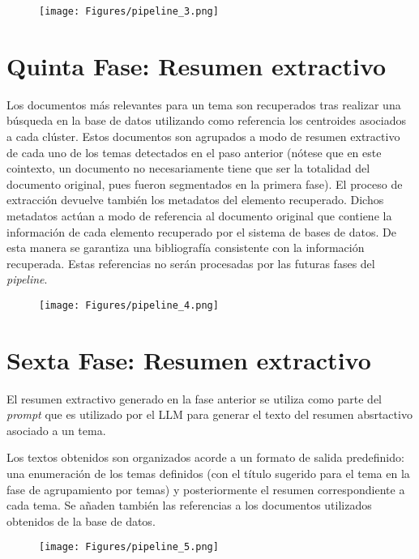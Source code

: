     \begin{figure}[H]    
        \centering
        \texttt{[image: Figures/pipeline\_3.png]}
        \caption*{}
    \end{figure}

    \section{Quinta Fase: Resumen extractivo} 
    Los documentos más relevantes para un tema son recuperados tras realizar una búsqueda en la base de datos utilizando como referencia los centroides asociados a cada clúster. Estos documentos son agrupados a modo de resumen extractivo de cada uno de los temas detectados en el paso anterior (nótese que en este cointexto, un documento no necesariamente tiene que ser la totalidad del documento original, pues fueron segmentados en la primera fase). El proceso de extracción devuelve también los metadatos del elemento recuperado. Dichos metadatos actúan a modo de referencia al documento original que contiene la información de cada elemento recuperado por el sistema de bases de datos. De esta manera se garantiza una bibliografía consistente con la información recuperada. Estas referencias no serán procesadas por las futuras fases del \emph{pipeline}.
    
    \begin{figure}[H]    
        \centering
        \texttt{[image: Figures/pipeline\_4.png]}
        \caption*{}
    \end{figure}

    \section{Sexta Fase: Resumen extractivo}
    El resumen extractivo generado en la fase anterior se utiliza como parte del \emph{prompt} que es utilizado por el LLM para generar el texto del resumen absrtactivo asociado a un tema.

    Los textos obtenidos son organizados acorde a un formato de salida predefinido: una enumeración de los temas definidos (con el título sugerido para el tema en la fase de agrupamiento por temas) y posteriormente el resumen correspondiente a cada tema. Se añaden también las referencias a los documentos utilizados obtenidos de la base de datos.

    \begin{figure}[H]    
        \centering
        \texttt{[image: Figures/pipeline\_5.png]}
        \caption*{}
    \end{figure}
    